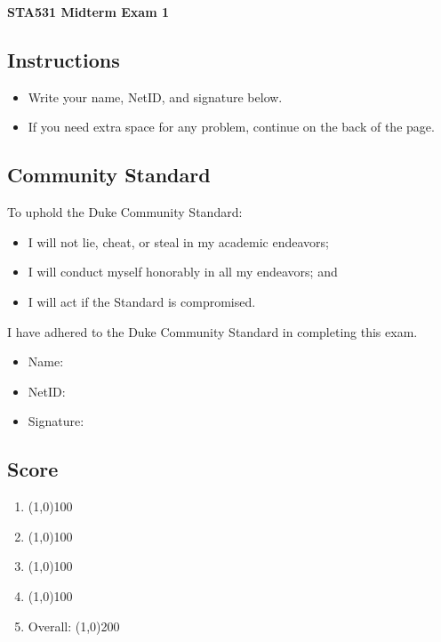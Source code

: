 \documentclass[12pt]{article}
\begin{document}
\begin{center}
\large\textbf{STA531 Midterm Exam 1}
\end{center}

\small

\subsection*{Instructions}
\begin{itemize}
    \item Write your name, NetID, and signature below.
    \item If you need extra space for any problem, continue on the back of the page.
\end{itemize}

\subsection*{Community Standard}
To uphold the Duke Community Standard:
\begin{itemize}
\item I will not lie, cheat, or steal in my academic endeavors;
\item I will conduct myself honorably in all my endeavors; and
\item I will act if the Standard is compromised.
\end{itemize}
I have adhered to the Duke Community Standard in completing this exam.

\vspace{1em}
\begin{itemize}
    \setlength\itemsep{1em}
    \item[] Name: \hrulefill
    \item[] NetID: \hrulefill
    \item[] Signature: \hrulefill
\end{itemize}

\subsection*{Score}

\vspace{1em}
\begin{enumerate}
    \setlength\itemsep{1em}
    \item \line(1,0){100}
    \item \line(1,0){100}
    \item \line(1,0){100}
    \item \line(1,0){100}
        \vspace{1em}
    \item[] Overall: \line(1,0){200}
\end{enumerate}
\end{document}
